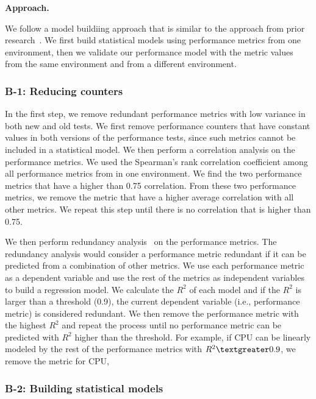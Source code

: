 \noindent \textbf{Approach. }

We follow a model buildiing approach that is similar to the approach from prior research~\cite{Shang:2015:ADP:2668930.2688052,Cohen:2005:CIC:1095810.1095821,xiong2013vperfguard}. We first build statistical models using performance metrics from one environment, then we validate our performance model with the metric values from the same environment and from a different environment.
\subsubsection{B-1: Reducing counters}

In the first step, we remove redundant performance metrics with low variance in both new and old tests. We first remove performance counters that have constant values in both versions of the performance tests, since such metrics cannot be included in a statistical model. We then perform a correlation analysis on the performance metrics. We used the Spearman's rank correlation coefficient among all performance metrics from in one environment. We find the two performance metrics that have a higher than 0.75 correlation. From these two performance metrics, we remove the metric that have a higher average correlation with all other metrics. We repeat this step until there is no correlation that is higher than 0.75.

We then perform redundancy analysis~\cite{harrell2001regression} on the performance metrics. The redundancy analysis would consider a performance metric redundant if it can be predicted from a combination of other metrics. We use each performance metric as a dependent variable and use the rest of the metrics as independent variables to build a regression model. We calculate the $R^2$ of each model and if the $R^2$ is larger than a threshold (0.9), the current dependent variable (i.e., performance metric) is considered redundant. We then remove the performance metric with the highest $R^2$ and repeat the process until no performance metric can be predicted with $R^2$ higher than the threshold. For example, if CPU can be linearly modeled by the rest of the performance metrics with $R^2\textgreater0.9$, we remove the metric for CPU, 

\subsubsection{B-2: Building statistical models}

